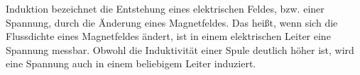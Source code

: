 Induktion bezeichnet die Entstehung eines elektrischen Feldes, bzw. einer Spannung, durch die Änderung eines Magnetfeldes. Das heißt, wenn sich die Flussdichte eines Magnetfeldes ändert, ist in einem elektrischen Leiter eine Spannung messbar. Obwohl die Induktivität einer Spule deutlich höher ist, wird eine Spannung auch in einem beliebigem Leiter induziert.